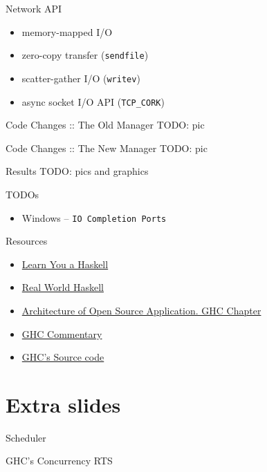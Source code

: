 \documentclass{beamer}
\begin{document}
\begin{frame}{Network API}
  \begin{itemize}
    \item memory-mapped I/O
    \item zero-copy transfer (\texttt{sendfile})
    \item scatter-gather I/O (\texttt{writev})
    \item async socket I/O API (\texttt{TCP\_CORK})
  \end{itemize}
\end{frame}

\begin{frame}{Code Changes :: The Old Manager}
  TODO: pic
\end{frame}

\begin{frame}{Code Changes :: The New Manager}
  TODO: pic
\end{frame}

\begin{frame}{Results}
  TODO: pics and graphics
\end{frame}

\begin{frame}{TODOs}
  \begin{itemize}
    \item Windows \pause -- \texttt{IO Completion Ports}
  \end{itemize}
\end{frame}

\begin{frame}{Resources}
  \begin{itemize}
    \item \href{http://learnyouahaskell.com/}{Learn You a Haskell}
    \item \href{http://book.realworldhaskell.org/read/}{Real World Haskell}
    \item \href{http://www.aosabook.org/en/ghc.html}{Architecture of Open Source Application. GHC Chapter}
    \item \href{http://hackage.haskell.org/trac/ghc/wiki/Commentary}{GHC Commentary}
    \item \href{https://github.com/ghc/ghc}{GHC's Source code}
  \end{itemize}
\end{frame}

\section{Extra slides}
\frame{\tableofcontents[currentsection]}

\begin{frame}{Scheduler}
\end{frame}

\begin{frame}{GHC's Concurrency RTS}
\end{frame}
\end{document}

